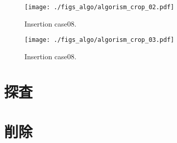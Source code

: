 \begin{figure}[h]
  \texttt{[image: ./figs\_algo/algorism\_crop\_02.pdf]}
  \caption{
    Insertion case08.
  }
\end{figure}

\begin{figure}[h]
  \texttt{[image: ./figs\_algo/algorism\_crop\_03.pdf]}
  \caption{
    Insertion case08.
  }
  \label{fig_IpCHashT_insert_hard_case08}
\end{figure}




\section{探査}
\section{削除}










